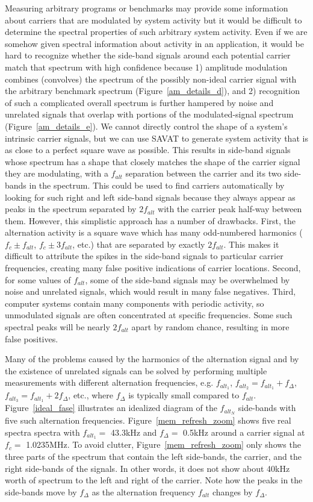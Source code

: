 Measuring arbitrary programs or benchmarks may provide some information about carriers that are modulated by system activity but it would be difficult to determine the spectral properties of such arbitrary system activity. Even if we are somehow given spectral information about activity in an application, it would be hard to recognize whether the side-band signals around each potential carrier match that spectrum with high confidence because 1) amplitude modulation combines (convolves) the spectrum of the possibly non-ideal carrier signal with the arbitrary benchmark spectrum (Figure~\ref{am_details_d}), and 2) recognition of such a complicated overall spectrum is further hampered by noise and unrelated signals that overlap with portions of the modulated-signal spectrum (Figure~\ref{am_details_e}).
%
We cannot directly control the shape of a system's intrinsic carrier signals, but we can use SAVAT to generate system activity that is as close to a perfect square wave as possible. This results in side-band signals whose spectrum has a shape that closely matches the shape of the carrier signal they are modulating, with a $f_{alt}$ separation between the carrier and its two side-bands in the spectrum. This could be used to find carriers automatically by looking for such right and left side-band signals because they always appear as peaks in the spectrum separated by $2f_{alt}$ with the carrier peak half-way between them. However, this simplistic approach has a number of drawbacks. First, the alternation activity is a square wave which has many odd-numbered harmonics ($f_c \pm f_{alt}$, $f_c \pm 3f_{alt}$, etc.) that are separated by exactly $2f_{alt}$. This makes it difficult to attribute the spikes in the side-band signals to particular carrier frequencies, creating many false positive indications of carrier locations. Second, for some values of $f_{alt}$, some of the side-band signals may be overwhelmed by noise and unrelated signals, which would result in many false negatives. Third, computer systems contain many components with periodic activity, so unmodulated signals are often concentrated at specific frequencies. Some such spectral peaks will be nearly $2f_{alt}$ apart by random chance, resulting in more false positives.

Many of the problems caused by the harmonics of the alternation signal and by the existence of unrelated signals can be solved by performing multiple measurements with different alternation frequencies, e.g. $f_{alt_1}$, $f_{alt_2}=f_{alt_1}+f_\Delta$, $f_{alt_3}=f_{alt_1}+2f_\Delta$, etc., where $f_\Delta$ is typically small compared to $f_{alt}$. Figure~\ref{ideal_fase} illustrates an idealized diagram of the $f_{alt_N}$ side-bands with five such alternation frequencies. Figure~\ref{mem_refresh_zoom} shows five real spectra spectra with $f_{alt_1} = $ 43.3kHz and $f_\Delta = $ 0.5kHz around a carrier signal at $f_c =$ 1.0235MHz. To avoid clutter, Figure~\ref{mem_refresh_zoom} only shows the three parts of the spectrum that contain the left side-bands, the carrier, and the right side-bands of the signals. In other words, it does not show about 40kHz worth of spectrum to the left and right of the carrier. Note how the peaks in the side-bands move by $f_\Delta$ as the alternation frequency $f_{alt}$ changes by $f_\Delta$.

